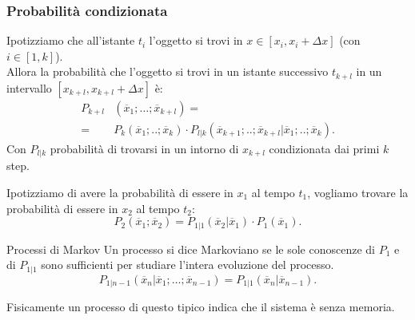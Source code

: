 \subsubsection{Probabilità condizionata}%
\label{subsub:Probabilità condizionata}
Ipotizziamo che all'istante $t_i$ l'oggetto si trovi in $x \in \left[x_i, x_i + \Delta x\right]$ (con $i \in \left[1, k\right]$).\\
Allora la probabilità che l'oggetto si trovi in un istante successivo $t_{k+l}$ in un intervallo $\left[x_{k+l}, x_{k+l} + \Delta x\right]$ è:
\[\begin{aligned}
    P_{k+l}&(\overline{x}_1;\ldots; \overline{x}_{k+l}) =\\
    =&P_k(\overline{x}_1;..;\overline{x}_k)\cdot P_{l|k}(\overline{x}_{k+1};..;\overline{x}_{k+l}|\overline{x}_1;..;\overline{x}_k) 
.\end{aligned}\]
Con $P_{l|k}$ probabilità di trovarsi in un intorno di $x_{k+l}$ condizionata dai primi $k$ step. 
\begin{exmp}
    Ipotizziamo di avere la probabilità di essere in $x_1$ al tempo $t_1$, vogliamo trovare la probabilità di essere in $x_2$ al tempo $t_2$:
    \[
	P_2(\overline{x}_1;\overline{x}_2) = P_{1|1}(\overline{x}_2|\overline{x}_1) \cdot P_1(\overline{x}_1) 
    .\] 
\end{exmp}
\noindent

\begin{greenbox}{Processi di Markov}
    Un processo si dice Markoviano se le sole conoscenze di $P_1$ e di $P_{1|1}$ sono sufficienti per studiare l'intera evoluzione del processo.
    \[
	P_{1|n-1}(\overline{x}_n|\overline{x}_1;\ldots;\overline{x}_{n-1})  = P_{1|1}(\overline{x}_n|\overline{x}_{n-1}) 
    .\] 
\end{greenbox}
\noindent
Fisicamente un processo di questo tipico indica che il sistema è senza memoria.


